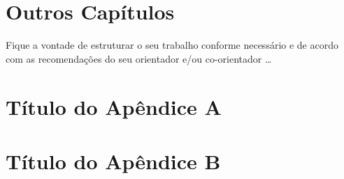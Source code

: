 \documentclass[
  12pt,		%
  a4paper,	%
  openright,%
  oneside,	%
  chapter=TITLE,		%
  section=TITLE,		%
  english,	%
  french,	%
  spanish,	%
  brazil
]{abntex2}
\begin{document}
     
     \chapter{Outros Capítulos}
    
        Fique a vontade de estruturar o seu trabalho conforme necessário e de acordo com as recomendações do seu orientador e/ou co-orientador \dots
    
    
    \postextual
    
    
    
    
    
    
    \begin{apendicesenv}
        
        \chapter{Título do Apêndice A}
            \lipsum[50]
        
        \chapter{Título do Apêndice B}
            \lipsum[51]
        
    \end{apendicesenv}
    
\end{document}
